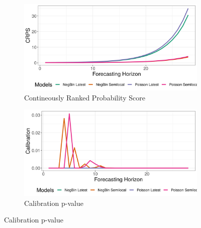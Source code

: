 \begin{figure}[H]
\begin{subfigure}{0.5\textwidth}
  \centering
  \includegraphics[width=\linewidth]{../output/Masereka_crps.png}  
  \caption{Contineously Ranked Probability Score}
  \label{Masereka_scores_1}
\end{subfigure}
\begin{subfigure}{0.5\textwidth}
  \centering
  \includegraphics[width=\linewidth]{../output/Masereka_calibration.png}  
  \caption{Calibration p-value}
  \label{Masereka_scores_2}
\end{subfigure}


\end{figure}
